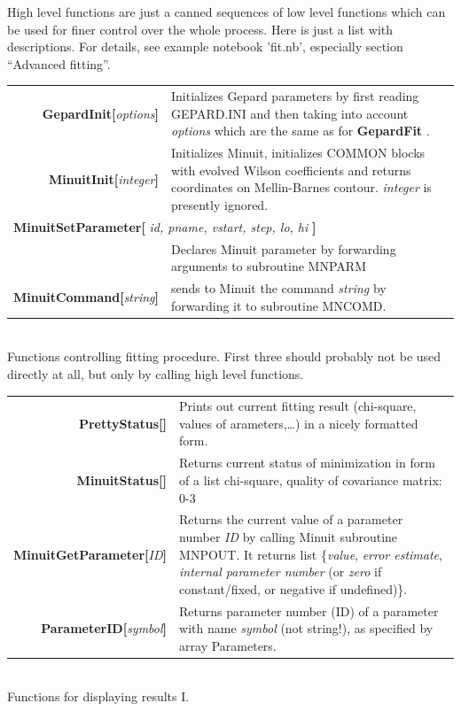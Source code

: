 \documentclass[12pt]{article}
\newcommand{\defboxitem}[3]{ {\ttfamily \bfseries #1[}\emph{#2}{\ttfamily \bfseries ]} & #3 }
\newcommand{\mmacomm}[1]{ {\ttfamily \bfseries #1} }
\begin{document}
High level functions are just a canned sequences of low level functions which can
be used for finer control over the whole process. Here is just a list with
descriptions. For details, see example notebook 'fit.nb', especially section ``Advanced fitting''.


\begin{flushleft}
\colorbox{defbox}{%
\begin{minipage}{\textwidth}%
\begin{tabular}{rp{8cm}}%
\defboxitem{GepardInit}{options}{Initializes Gepard parameters by first reading GEPARD.INI
and then taking into account \emph{options} which are the same as for 
\mmacomm{GepardFit}. } \\[0.8ex]
\defboxitem{MinuitInit}{integer}{Initializes Minuit, initializes COMMON blocks with evolved
Wilson coefficients and returns coordinates on Mellin-Barnes contour. \emph{integer} is
presently ignored.} \\[0.8ex]
\multicolumn{2}{l}{\mmacomm{MinuitSetParameter[}\emph{id, pname, vstart, step, lo, hi}
\mmacomm{]} } \\
 & Declares Minuit parameter by forwarding arguments to subroutine MNPARM \\[0.8ex]
\defboxitem{MinuitCommand}{string}{sends to Minuit the command \emph{string} by
forwarding it to subroutine MNCOMD. } \\[0.8ex]
\end{tabular}%
\end{minipage}}\\[0.5ex]
{\small Functions controlling fitting procedure. First three should probably not be
used directly at all, but only by calling high level functions.}
\end{flushleft}


\begin{flushleft}
\colorbox{defbox}{%
\begin{minipage}{\textwidth}%
\begin{tabular}{rp{8cm}}%
\defboxitem{PrettyStatus}{}{Prints out current fitting result (chi-square, values of
arameters,\ldots) in a nicely formatted form.} \\[0.8ex]
\defboxitem{MinuitStatus}{}{Returns current status of minimization in form of a 
list {chi-square, quality of covariance matrix: 0-3}} \\[0.8ex]
\defboxitem{MinuitGetParameter}{ID}{Returns the current value of a parameter
number \emph{ID} by calling Minuit subroutine MNPOUT. It returns list 
\{\emph{value}, \emph{error estimate}, \emph{internal parameter number} (or \emph{zero} if
constant/fixed, or negative if undefined)\}. } \\[0.8ex]
\defboxitem{ParameterID}{symbol}{Returns parameter number (ID) of a parameter
with name \emph{symbol} (not string!), as specified by array Parameters.} \\[0.8ex]
\end{tabular}%
\end{minipage}}\\[0.5ex]
{\small Functions for displaying results I.}
\end{flushleft}
\end{document}
